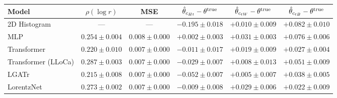 \begin{tabular}{lccccc}
\toprule
Model & $\rho(\log r)$ & MSE & $\hat{\theta}_{c_{Ht}} - \theta^{\rm true}$ & $\hat{\theta}_{c_{tW}} - \theta^{\rm true}$ & $\hat{\theta}_{c_{tB}} - \theta^{\rm true}$ \\
\midrule
2D Histogram & — & — & $-0.195 \pm 0.018$ & $+0.010 \pm 0.009$ & $+0.082 \pm 0.010$ \\
MLP & $0.254 \pm 0.004$ & $0.008 \pm 0.000$ & $+0.002 \pm 0.003$ & $+0.031 \pm 0.003$ & $+0.076 \pm 0.006$ \\
Transformer & $0.220 \pm 0.010$ & $0.007 \pm 0.000$ & $-0.011 \pm 0.017$ & $+0.019 \pm 0.009$ & $+0.027 \pm 0.004$ \\
Transformer (LLoCa) & $0.287 \pm 0.003$ & $0.007 \pm 0.000$ & $-0.029 \pm 0.007$ & $+0.008 \pm 0.013$ & $+0.051 \pm 0.009$ \\
LGATr & $0.215 \pm 0.008$ & $0.007 \pm 0.000$ & $-0.052 \pm 0.007$ & $+0.005 \pm 0.007$ & $+0.038 \pm 0.005$ \\
LorentzNet & $0.273 \pm 0.002$ & $0.007 \pm 0.000$ & $-0.009 \pm 0.008$ & $+0.029 \pm 0.006$ & $+0.022 \pm 0.009$ \\
\bottomrule
\end{tabular}
